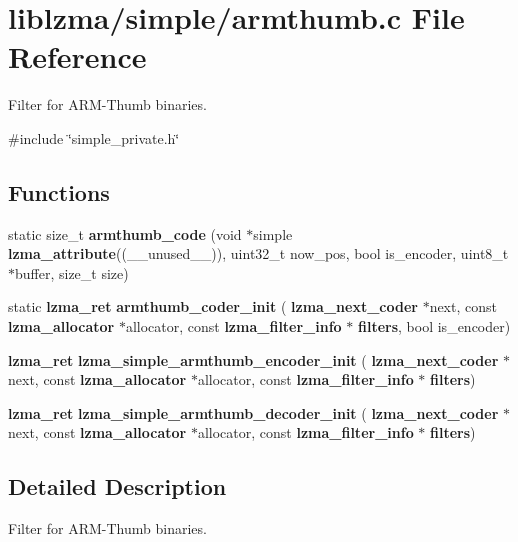 \section{liblzma/simple/armthumb.c File Reference}
\label{armthumb_8c}


Filter for A\+R\+M-\/\+Thumb binaries.  


{\ttfamily \#include \char`\"{}simple\+\_\+private.\+h\char`\"{}}\newline
\subsection*{Functions}
\begin{DoxyCompactItemize}
\item 
\mbox{\label{armthumb_8c_aaaf12f1927357cdd50d93c1943ad3de2}} 
static size\+\_\+t {\bfseries armthumb\+\_\+code} (void $\ast$simple \textbf{ lzma\+\_\+attribute}((\+\_\+\+\_\+unused\+\_\+\+\_\+)), uint32\+\_\+t now\+\_\+pos, bool is\+\_\+encoder, uint8\+\_\+t $\ast$buffer, size\+\_\+t size)
\item 
\mbox{\label{armthumb_8c_a8d8bc1da6c10acf3ce1cacb2a186f8bc}} 
static \textbf{ lzma\+\_\+ret} {\bfseries armthumb\+\_\+coder\+\_\+init} (\textbf{ lzma\+\_\+next\+\_\+coder} $\ast$next, const \textbf{ lzma\+\_\+allocator} $\ast$allocator, const \textbf{ lzma\+\_\+filter\+\_\+info} $\ast$\textbf{ filters}, bool is\+\_\+encoder)
\item 
\mbox{\label{armthumb_8c_af0df83ba4f024159ab2c6366fb3380da}} 
\textbf{ lzma\+\_\+ret} {\bfseries lzma\+\_\+simple\+\_\+armthumb\+\_\+encoder\+\_\+init} (\textbf{ lzma\+\_\+next\+\_\+coder} $\ast$next, const \textbf{ lzma\+\_\+allocator} $\ast$allocator, const \textbf{ lzma\+\_\+filter\+\_\+info} $\ast$\textbf{ filters})
\item 
\mbox{\label{armthumb_8c_a9394d8f92e68fb067ff5ab7224bffb34}} 
\textbf{ lzma\+\_\+ret} {\bfseries lzma\+\_\+simple\+\_\+armthumb\+\_\+decoder\+\_\+init} (\textbf{ lzma\+\_\+next\+\_\+coder} $\ast$next, const \textbf{ lzma\+\_\+allocator} $\ast$allocator, const \textbf{ lzma\+\_\+filter\+\_\+info} $\ast$\textbf{ filters})
\end{DoxyCompactItemize}


\subsection{Detailed Description}
Filter for A\+R\+M-\/\+Thumb binaries. 

